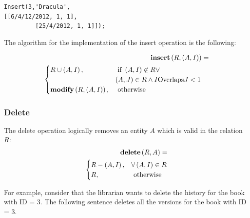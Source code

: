 \begin{enumerate}
\begin{enumerate}
	      \begin{verbatim}
Insert(3,'Dracula',
[[6/4/12/2012, 1, 1],
         [25/4/2012, 1, 1]]);
	    \end{verbatim}
	\end{enumerate}

\end{enumerate}

The algorithm for the implementation of the insert operation is the following:

\begin{align}
\label{eq:insert-fuzzy-temporal}
\mbox{\textbf{insert}} \left(R ,\left(A, I \right) \right) &=\\
\begin{cases}
\nonumber
R \cup \left(A, I \right), & \mbox{ if }  \left(A, I \right) \not \in R \vee \\
&  \left(A, J \right) \in R \wedge I \text{Overlaps} J < 1\\
\mbox{\textbf{modify}} \left(R, \left(A, I \right)\right), & \mbox{ otherwise }  
\end{cases} 	
\end{align}
\subsubsection{\label{subsubsec:delete-fuzzy-temporal}Delete}
The delete operation logically removes an entity $A$ which is valid in the relation $R$:
\begin{align}
\label{eq:delete-fuzzy-temporal}
\mbox{\textbf{delete}} \left(R ,A \right) =\\
\begin{cases}
\nonumber
R - \left(A, I \right), &  \forall \left( A, I \right) \in R\\
R, & \mbox{ otherwise }  
\end{cases} 	
\end{align}

For example, consider that the librarian wants to delete the history for the book with ID = 3. The following sentence deletes all the versions for the book with ID = 3.

